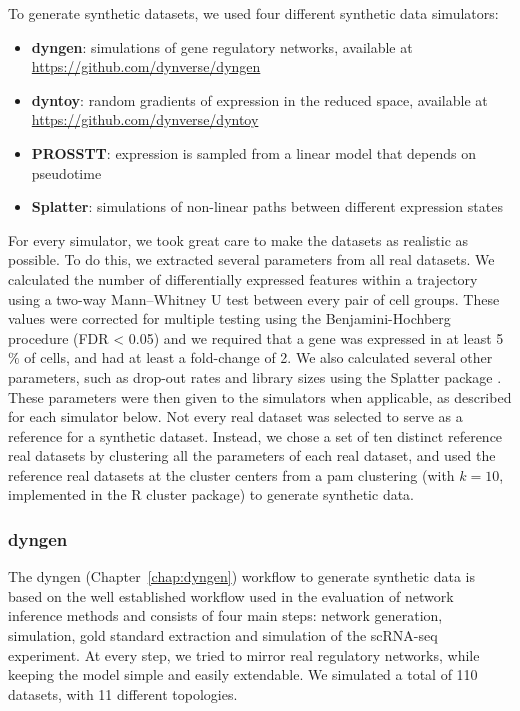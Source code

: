 To generate synthetic datasets, we used four different synthetic data simulators:

\begin{itemize}
	\item \textbf{dyngen}: simulations of gene regulatory networks, available at \url{https://github.com/dynverse/dyngen}
	\item \textbf{dyntoy}: random gradients of expression in the reduced space, available at \url{https://github.com/dynverse/dyntoy}
	\item \textbf{PROSSTT}: expression is sampled from a linear model that depends on pseudotime \cite{papadopoulos_prossttprobabilisticsimulation_2018}
	\item \textbf{Splatter}: simulations of non-linear paths between different expression states \cite{zappia_splattersimulationsinglecell_2017}
\end{itemize}


For every simulator, we took great care to make the datasets as realistic as possible. To do this, we extracted several parameters from all real datasets. We calculated the number of differentially expressed features within a trajectory using a two-way Mann–Whitney U test between every pair of cell groups. These values were corrected for multiple testing using the Benjamini-Hochberg procedure (FDR < 0.05) and we required that a gene was expressed in at least 5$\%$ of cells, and had at least a fold-change of 2. We also calculated several other parameters, such as drop-out rates and library sizes using the Splatter package \cite{zappia_splattersimulationsinglecell_2017}. These parameters were then given to the simulators when applicable, as described for each simulator below. Not every real dataset was selected to serve as a reference for a synthetic dataset. Instead, we chose a set of ten distinct reference real datasets by clustering all the parameters of each real dataset, and used the reference real datasets at the cluster centers from a pam clustering (with $k = 10$, implemented in the R cluster package) to generate synthetic data.

\subsubsection{dyngen}

The dyngen (Chapter~\ref{chap:dyngen}) workflow to generate synthetic data is based on the well established workflow used in the evaluation of network inference methods \cite{schaffter_genenetweaversilicobenchmark_2011,marbach_wisdomcrowdsrobust_2012} and consists of four main steps: network generation, simulation, gold standard extraction and simulation of the scRNA-seq experiment. At every step, we tried to mirror real regulatory networks, while keeping the model simple and easily extendable. We simulated a total of 110 datasets, with 11 different topologies. 

